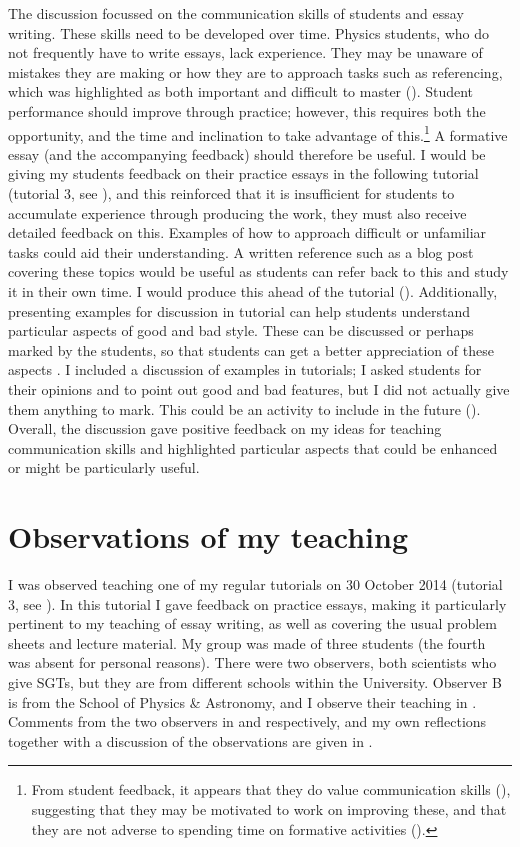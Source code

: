 The discussion focussed on the communication skills of students and essay writing. These skills need to be developed over time. Physics students, who do not frequently have to write essays, lack experience. They may be unaware of mistakes they are making or how they are to approach tasks such as referencing, which was highlighted as both important and difficult to master (). Student performance should improve through practice; however, this requires both the opportunity, and the time and inclination to take advantage of this.\footnote{From student feedback, it appears that they do value communication skills (), suggesting that they may be motivated to work on improving these, and that they are not adverse to spending time on formative activities ().} A formative essay (and the accompanying feedback) should therefore be useful. I would be giving my students feedback on their practice essays in the following tutorial (tutorial 3, see ), and this reinforced that it is insufficient for students to accumulate experience through producing the work, they must also receive detailed feedback on this. Examples of how to approach difficult or unfamiliar tasks could aid their understanding. A written reference such as a blog post covering these topics would be useful as students can refer back to this and study it in their own time. I would produce this ahead of the tutorial (). Additionally, presenting examples for discussion in tutorial can help students understand particular aspects of good and bad style. These can be discussed or perhaps marked by the students, so that students can get a better appreciation of these aspects \citep[chapter 10]{Ramsden1992}. I included a discussion of examples in tutorials; I asked students for their opinions and to point out good and bad features, but I did not actually give them anything to mark. This could be an activity to include in the future (). Overall, the discussion gave positive feedback on my ideas for teaching communication skills and highlighted particular aspects that could be enhanced or might be particularly useful.


\section{Observations of my teaching}\label{sec:me}

I was observed teaching one of my regular tutorials on 30 October 2014 (tutorial 3, see ). In this tutorial I gave feedback on practice essays, making it particularly pertinent to my teaching of essay writing, as well as covering the usual problem sheets and lecture material. My group was made of three students (the fourth was absent for personal reasons). There were two observers, both scientists who give SGTs, but they are from different schools within the University. Observer B is from the School of Physics \& Astronomy, and I observe their teaching in . Comments from the two observers in  and  respectively, and my own reflections together with a discussion of the observations are given in .

